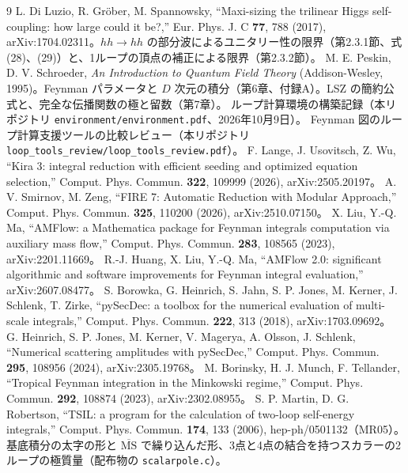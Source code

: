 \documentclass[a4paper,10pt]{ltjsarticle}
\begin{document}
\begin{thebibliography}{9}
 L. Di Luzio, R. Gr\"ober, M. Spannowsky, ``Maxi-sizing the trilinear Higgs self-coupling: how large could it be?,'' Eur. Phys. J. C \textbf{77}, 788 (2017), arXiv:1704.02311。$hh\to hh$ の部分波によるユニタリー性の限界（第2.3.1節、式 (28)、(29)）と、1ループの頂点の補正による限界（第2.3.2節）。
 M. E. Peskin, D. V. Schroeder, \textit{An Introduction to Quantum Field Theory} (Addison-Wesley, 1995)。Feynman パラメータと $D$ 次元の積分（第6章、付録A）。LSZ の簡約公式と、完全な伝播関数の極と留数（第7章）。
 ループ計算環境の構築記録（本リポジトリ \nolinkurl{environment/environment.pdf}、2026年10月9日）。
 Feynman 図のループ計算支援ツールの比較レビュー（本リポジトリ \nolinkurl{loop_tools_review/loop_tools_review.pdf}）。
 F. Lange, J. Usovitsch, Z. Wu, ``Kira 3: integral reduction with efficient seeding and optimized equation selection,'' Comput. Phys. Commun. \textbf{322}, 109999 (2026), arXiv:2505.20197。
 A. V. Smirnov, M. Zeng, ``FIRE 7: Automatic Reduction with Modular Approach,'' Comput. Phys. Commun. \textbf{325}, 110200 (2026), arXiv:2510.07150。
 X. Liu, Y.-Q. Ma, ``AMFlow: a Mathematica package for Feynman integrals computation via auxiliary mass flow,'' Comput. Phys. Commun. \textbf{283}, 108565 (2023), arXiv:2201.11669。
 R.-J. Huang, X. Liu, Y.-Q. Ma, ``AMFlow 2.0: significant algorithmic and software improvements for Feynman integral evaluation,'' arXiv:2607.08477。
 S. Borowka, G. Heinrich, S. Jahn, S. P. Jones, M. Kerner, J. Schlenk, T. Zirke, ``pySecDec: a toolbox for the numerical evaluation of multi-scale integrals,'' Comput. Phys. Commun. \textbf{222}, 313 (2018), arXiv:1703.09692。
 G. Heinrich, S. P. Jones, M. Kerner, V. Magerya, A. Olsson, J. Schlenk, ``Numerical scattering amplitudes with pySecDec,'' Comput. Phys. Commun. \textbf{295}, 108956 (2024), arXiv:2305.19768。
 M. Borinsky, H. J. Munch, F. Tellander, ``Tropical Feynman integration in the Minkowski regime,'' Comput. Phys. Commun. \textbf{292}, 108874 (2023), arXiv:2302.08955。
 S. P. Martin, D. G. Robertson, ``TSIL: a program for the calculation of two-loop self-energy integrals,'' Comput. Phys. Commun. \textbf{174}, 133 (2006), hep-ph/0501132（MR05）。基底積分の太字の形と $\overline{\mathrm{MS}}$ で繰り込んだ形、3点と4点の結合を持つスカラーの2ループの極質量（配布物の \texttt{scalarpole.c}）。
\end{thebibliography}
\end{document}
